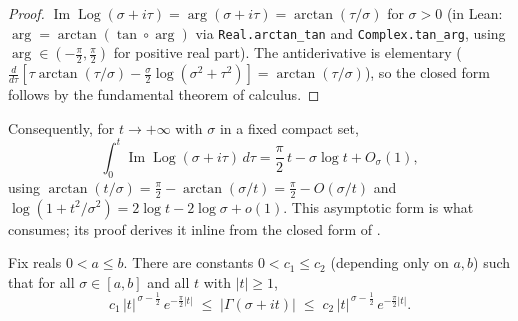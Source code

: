 \begin{proof}
\leanok
$\operatorname{Im}\operatorname{Log}(\sigma+i\tau)=\arg(\sigma+i\tau)
=\arctan(\tau/\sigma)$ for $\sigma>0$ (in Lean:
$\arg=\arctan(\tan\circ\arg)$ via \texttt{Real.arctan\_tan} and \texttt{Complex.tan\_arg},
using $\arg\in(-\tfrac\pi2,\tfrac\pi2)$ for positive real part). The antiderivative is elementary
($\frac{d}{d\tau}[\tau\arctan(\tau/\sigma)-\tfrac\sigma2\log(\sigma^2+\tau^2)]
=\arctan(\tau/\sigma)$), so the closed form follows by the fundamental theorem of calculus.
\end{proof}

\begin{remark}
\label{rem:gs_arg_asymptotic}
Consequently, for $t\to+\infty$ with $\sigma$ in a fixed compact set,
\[
  \int_{0}^{t}\operatorname{Im}\operatorname{Log}(\sigma+i\tau)\,d\tau
  = \frac{\pi}{2}\,t - \sigma\log t + O_\sigma(1),
\]
using $\arctan(t/\sigma)=\tfrac\pi2-\arctan(\sigma/t)=\tfrac\pi2-O(\sigma/t)$ and
$\log(1+t^2/\sigma^2)=2\log t-2\log\sigma+o(1)$. This asymptotic form is what  consumes; its
proof derives it inline from the closed form of .
\end{remark}

\begin{theorem}
\label{thm:gs_Gamma_growth}
\leanok
{}
Fix reals $0<a\le b$. There are constants $0<c_1\le c_2$ (depending only on $a,b$)
such that for all $\sigma\in[a,b]$ and all $t$ with $|t|\ge1$,
\[
  c_1\,|t|^{\,\sigma-\frac12}\,e^{-\frac{\pi}{2}|t|}
  \;\le\; \bigl|\Gamma(\sigma+it)\bigr|
  \;\le\; c_2\,|t|^{\,\sigma-\frac12}\,e^{-\frac{\pi}{2}|t|}.
\]
\end{theorem}

